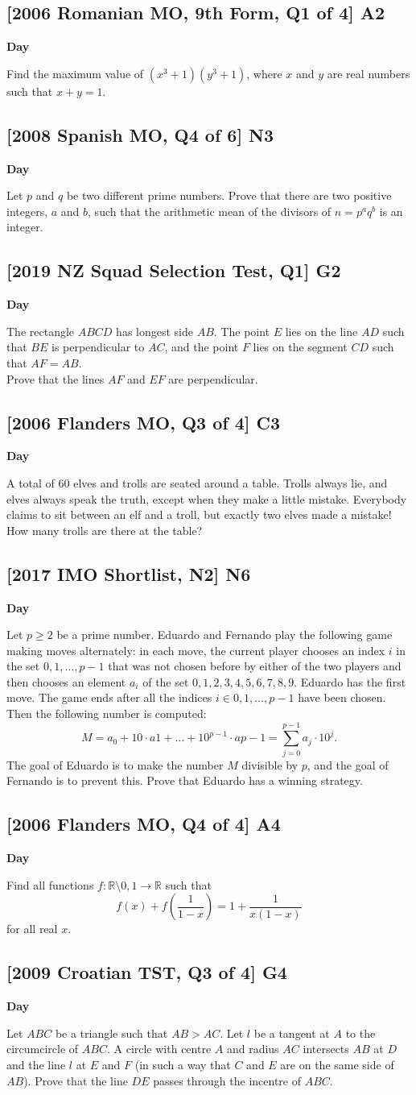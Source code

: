 \documentclass[10pt]{article}
\newcommand{\themonth}{March}
\newcommand{\theyear}{2019}
\newcounter{day}
\newcounter{solution}
\newcounter{datenumber}
\newcommand{\problem}[4][0]{
	\newpage
	\subsection{[#3] \space #2} \hfill 
	{\large\textbf{Day \arabic{day}}} %
	\begin{flushleft} #4 \end{flushleft}
	\vspace{1em}
	\addtocounter{day}{1}
	\addtocounter{datenumber}{1}
	\setcounter{solution}{1}
}
\begin{document}
\problem[41]{A2}{2006 Romanian MO, 9th Form, Q1 of 4}{Find the maximum value of $\left(x^3+1\right)\left(y^3+1\right)$, where $x$ and $y$ are real numbers such that $x + y = 1$.}

\problem[42]{N3}{2008 Spanish MO, Q4 of 6}{Let $p$ and $q$ be two different prime numbers. Prove that there are two positive integers, $a$ and $b$, such that the arithmetic mean of the divisors of $n = p^a q^b$ is an integer.}

\problem[43]{G2}{2019 NZ Squad Selection Test, Q1}{The rectangle $ABCD$ has longest side $AB$. The point $E$ lies on the line $AD$ such that $BE$ is perpendicular to $AC$, and the point $F$ lies on the segment $CD$ such that $AF = AB$.\\Prove that the lines $AF$ and $EF$ are perpendicular.}

\problem[44]{C3}{2006 Flanders MO, Q3 of 4}{A total of 60 elves and trolls are seated around a table. Trolls always lie, and elves always speak the truth, except when they make a little mistake. Everybody claims to sit between an elf and a troll, but exactly two elves made a mistake! How many trolls are there at the table?}

\problem[45]{N6}{2017 IMO Shortlist, N2}{Let $p \geq 2$ be a prime number. Eduardo and Fernando play the following game making moves alternately: in each move, the current player chooses an index $i$ in the set ${0,1,\dots,p-1}$ that was not chosen before by either of the two players and then chooses an element $a_i$ of the set ${0,1,2,3,4,5,6,7,8,9}$. Eduardo has the first move. The game ends after all the indices $i \in {0,1,\dots,p-1}$ have been chosen. Then the following number is computed: \begin{equation}M = a_0 + 10\cdot a1 + \dots + 10^{p-1} \cdot a{p-1} = \sum_{j=0}^{p-1} a_j \cdot 10^j.\end{equation} The goal of Eduardo is to make the number $M$ divisible by $p$, and the goal of Fernando is to prevent this. Prove that Eduardo has a winning strategy.}

\problem[46]{A4}{2006 Flanders MO, Q4 of 4}{Find all functions $f:\mathbb{R}\setminus{0,1}\to\mathbb{R}$ such that \begin{equation}f(x) + f(\frac{1}{1-x})  = 1 + \frac{1}{x(1-x)}\end{equation} for all real $x$.}

\problem[47]{G4}{2009 Croatian TST, Q3 of 4}{Let $ABC$ be a triangle such that $AB > AC$. Let $l$ be a tangent at $A$ to the circumcircle of $ABC$. A circle with centre $A$ and radius $AC$ intersects $AB$ at $D$ and the line $l$ at $E$ and $F$ (in such a way that $C$ and $E$ are on the same side of $AB$). Prove that the line $DE$ passes through the incentre of $ABC$.}
\end{document}

